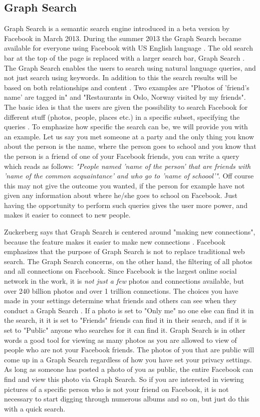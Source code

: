 \subsection{Graph Search}
Graph Search is a semantic search engine introduced in a beta version by Facebook in March 2013. During the summer 2013 the Graph Search became available for everyone using Facebook with US English language \cite{graphsearchnet}. The old search bar at the top of the page is replaced with a larger search bar, Graph Search \cite{graphsearchfb}. The Graph Search enables the users to search using natural language queries, and not just search using keywords. In addition to this the search results will be based on both relationships and content \citep{graphsearchnet}. Two examples are "Photos of 'friend's name' are tagged in" and "Restaurants in Oslo, Norway visited by my friends". The basic idea is that the users are given the possibility to search Facebook for different stuff (photos, people, places etc.) in a specific subset, specifying the queries \cite{graphsearchew}. To emphasize how specific the search can be, we will provide you with an example. Let us say you met someone at a party and the only thing you know about the person is the name, where the person goes to school and you know that the person is a friend of one of your Facebook friends, you can write a query which reads as follows: \textit{"People named 'name of the person' that are friends with 'name of the common acquaintance' and who go to 'name of schoool'"}. Off course this may not give the outcome you wanted, if the person for example have not given any information about where he/she goes to school on Facebook. Just having the opportunity to perform such queries gives the user more power, and makes it easier to connect to new people. 

Zuckerberg says that Graph Search is centered around "making new connections", because the feature makes it easier to make new connections \cite{graphsearchew}. Facebook emphasizes that the purpose of Graph Search is not to replace traditional web search. The Graph Search concerns, on the other hand, the filtering of all photos and all connections on Facebook. Since Facebook is the largest online social network in the work, it is \textit{not just a few} photos and connections available, but over 240 billion photos and over 1 trillion connections. The choices you have made in your settings determine what friends and others can see when they conduct a Graph Search \cite{graphsearchtips}. If a photo is set to "Only me" no one else can find it in the search, it it is set to "Friends" friends can find it in their search, and if it is set to "Public" anyone who searches for it can find it. Graph Search is in other words a good tool for viewing as many photos as you are allowed to view of people who are not your Facebook friends. The photos of you that are public will come up in a Graph Search regardless of how you have set your privacy settings. As long as someone has posted a photo of you as public, the entire Facebook can find and view this photo via Graph Search. So if you are interested in viewing pictures of a specific person who is not your friend on Facebook, it is not necessary to start digging through numerous albums and so on, but just do this with a quick search. 

